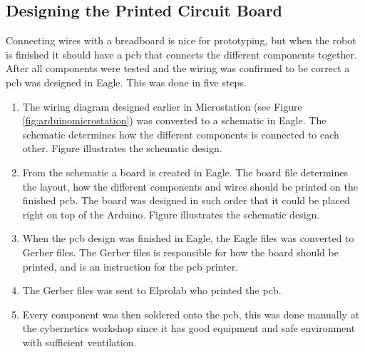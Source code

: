 \subsection{Designing the Printed Circuit Board}
Connecting wires with a breadboard is nice for prototyping, but when the robot is finished it should have a \acrshort{pcb} that connects the different components together. After all components were tested and the wiring was confirmed to be correct a \acrshort{pcb} was designed in Eagle. This was done in five steps.
\begin{enumerate}[1.]
\item The wiring diagram designed earlier in Microstation (see Figure \ref{fig:arduinomicrostation}) was converted to a schematic in Eagle. The schematic determines how the different components is connected to each other. Figure 
illustrates the schematic design.
\item From the schematic a board is created in Eagle. The board file determines the layout, how the different components and wires should be printed on the finished \acrshort{pcb}. The board was designed in such order that it could be placed right on top of the Arduino. Figure 
illustrates the schematic design.
\item When the \acrshort{pcb} design was finished in Eagle, the Eagle files was converted to Gerber files. The Gerber files is responsible for how the board should be printed, and is an instruction for the \acrshort{pcb} printer.
\item The Gerber files was sent to Elprolab who printed the \acrshort{pcb}.
\item Every component was then soldered onto the \acrshort{pcb}, this was done manually at the cybernetics workshop since it has good equipment and safe environment with sufficient ventilation.
\end{enumerate}